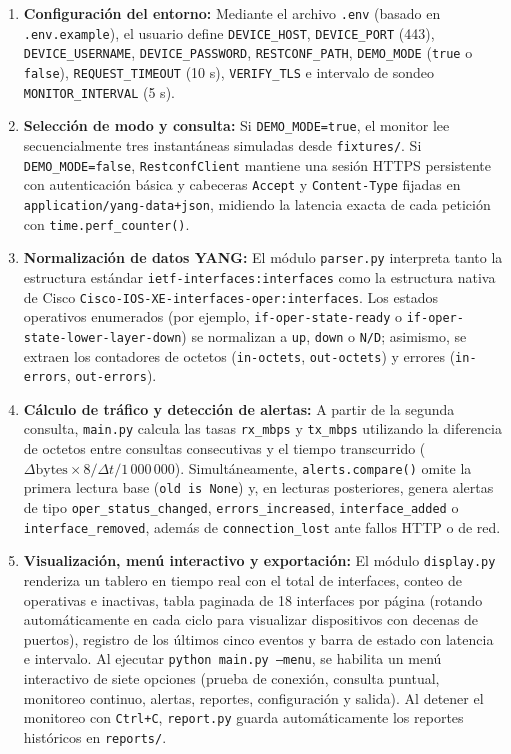 \documentclass[12pt,a4paper]{article}
\begin{document}
\begin{enumerate}
    \item \textbf{Configuración del entorno:} Mediante el archivo \texttt{.env} (basado en \texttt{.env.example}), el usuario define \texttt{DEVICE\_HOST}, \texttt{DEVICE\_PORT} (443), \texttt{DEVICE\_USERNAME}, \texttt{DEVICE\_PASSWORD}, \texttt{RESTCONF\_PATH}, \texttt{DEMO\_MODE} (\texttt{true} o \texttt{false}), \texttt{REQUEST\_TIMEOUT} (10 s), \texttt{VERIFY\_TLS} e intervalo de sondeo \texttt{MONITOR\_INTERVAL} (5 s).
    \item \textbf{Selección de modo y consulta:} Si \texttt{DEMO\_MODE=true}, el monitor lee secuencialmente tres instantáneas simuladas desde \texttt{fixtures/}. Si \texttt{DEMO\_MODE=false}, \texttt{RestconfClient} mantiene una sesión HTTPS persistente con autenticación básica y cabeceras \texttt{Accept} y \texttt{Content-Type} fijadas en \texttt{application/yang-data+json}, midiendo la latencia exacta de cada petición con \texttt{time.perf\_counter()}.
    \item \textbf{Normalización de datos YANG:} El módulo \texttt{parser.py} interpreta tanto la estructura estándar \texttt{ietf-interfaces:interfaces} como la estructura nativa de Cisco \texttt{Cisco-IOS-XE-interfaces-oper:interfaces}. Los estados operativos enumerados (por ejemplo, \texttt{if-oper-state-ready} o \texttt{if-oper-state-lower-layer-down}) se normalizan a \texttt{up}, \texttt{down} o \texttt{N/D}; asimismo, se extraen los contadores de octetos (\texttt{in-octets}, \texttt{out-octets}) y errores (\texttt{in-errors}, \texttt{out-errors}).
    \item \textbf{Cálculo de tráfico y detección de alertas:} A partir de la segunda consulta, \texttt{main.py} calcula las tasas \texttt{rx\_mbps} y \texttt{tx\_mbps} utilizando la diferencia de octetos entre consultas consecutivas y el tiempo transcurrido ($\Delta\textrm{bytes} \times 8 / \Delta t / 1\,000\,000$). Simultáneamente, \texttt{alerts.compare()} omite la primera lectura base (\texttt{old is None}) y, en lecturas posteriores, genera alertas de tipo \texttt{oper\_status\_changed}, \texttt{errors\_increased}, \texttt{interface\_added} o \texttt{interface\_removed}, además de \texttt{connection\_lost} ante fallos HTTP o de red.
    \item \textbf{Visualización, menú interactivo y exportación:} El módulo \texttt{display.py} renderiza un tablero en tiempo real con el total de interfaces, conteo de operativas e inactivas, tabla paginada de 18 interfaces por página (rotando automáticamente en cada ciclo para visualizar dispositivos con decenas de puertos), registro de los últimos cinco eventos y barra de estado con latencia e intervalo. Al ejecutar \texttt{python main.py --menu}, se habilita un menú interactivo de siete opciones (prueba de conexión, consulta puntual, monitoreo continuo, alertas, reportes, configuración y salida). Al detener el monitoreo con \texttt{Ctrl+C}, \texttt{report.py} guarda automáticamente los reportes históricos en \texttt{reports/}.
\end{enumerate}
\end{document}
